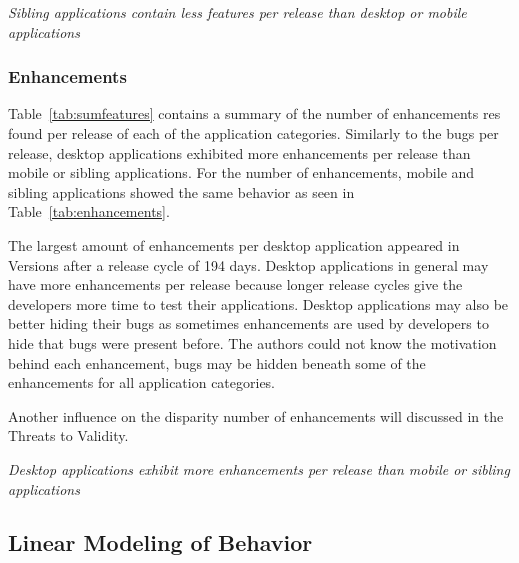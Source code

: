 \documentclass{acm_proc_article-sp}
\begin{document}
\textit{Sibling applications contain less features per release than desktop or mobile applications}
\subsubsection{Enhancements}

\begin{center}

\label{tab:sumenhance}
\end{center}

\begin{center}

\label{tab:enhancements}
\end{center}

Table~\ref{tab:sumfeatures} contains a summary of the number of enhancements res found per release of each of the application categories. 
Similarly to the bugs per release, desktop applications exhibited more enhancements per release than mobile or sibling applications.
For the number of enhancements, mobile and sibling applications showed the same behavior as seen in Table~\ref{tab:enhancements}.

The largest amount of enhancements per desktop application appeared in Versions after a release cycle of 194 days.
Desktop applications in general may have more enhancements per release because longer release cycles give the developers more time to test their applications.
Desktop applications may also be better hiding their bugs as sometimes enhancements are used by developers to hide that bugs were present before.
The authors could not know the motivation behind each enhancement, bugs may be hidden beneath some of the enhancements for all application categories.

Another influence on the disparity number of enhancements will discussed in the Threats to Validity.


\textit{Desktop applications exhibit more enhancements per release than mobile or sibling applications}
\subsection{Linear Modeling of Behavior}




\begin{center}

\label{tab:mobileModel}
\end{center}


\begin{center}

\label{tab:desktopModel}
\end{center}
\end{document}
